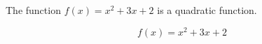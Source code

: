 \documentclass{article}
\begin{document}
    The function $f(x) = x^2 + 3x + 2$ is a quadratic function.

    \[
        f(x) = x^2 + 3x + 2
    \]
\end{document}
